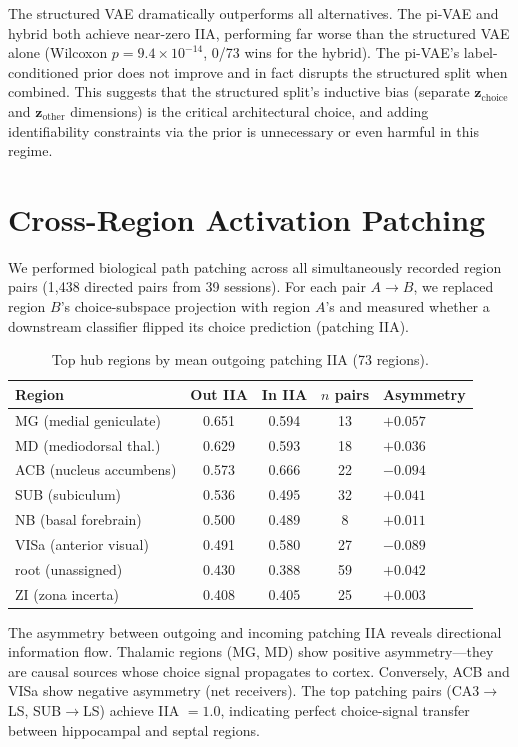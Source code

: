 \documentclass{article}
\begin{document}
The structured VAE dramatically outperforms all alternatives. The pi-VAE and hybrid both achieve near-zero IIA, performing far worse than the structured VAE alone (Wilcoxon $p = 9.4 \times 10^{-14}$, 0/73 wins for the hybrid). The pi-VAE's label-conditioned prior does not improve and in fact disrupts the structured split when combined. This suggests that the structured split's inductive bias (separate $\mathbf{z}_{\text{choice}}$ and $\mathbf{z}_{\text{other}}$ dimensions) is the critical architectural choice, and adding identifiability constraints via the prior is unnecessary or even harmful in this regime.

\section{Cross-Region Activation Patching}
\label{app:patching}

We performed biological path patching across all simultaneously recorded region pairs (1,438 directed pairs from 39 sessions). For each pair $A \to B$, we replaced region $B$'s choice-subspace projection with region $A$'s and measured whether a downstream classifier flipped its choice prediction (patching IIA).

\begin{table}[h]
\centering
\small
\caption{Top hub regions by mean outgoing patching IIA (73 regions).}
\label{tab:hubs}
\begin{tabular}{@{}lcccl@{}}
\toprule
\textbf{Region} & \textbf{Out IIA} & \textbf{In IIA} & \textbf{$n$ pairs} & \textbf{Asymmetry} \\
\midrule
MG (medial geniculate) & 0.651 & 0.594 & 13 & $+0.057$ \\
MD (mediodorsal thal.) & 0.629 & 0.593 & 18 & $+0.036$ \\
ACB (nucleus accumbens) & 0.573 & 0.666 & 22 & $-0.094$ \\
SUB (subiculum) & 0.536 & 0.495 & 32 & $+0.041$ \\
NB (basal forebrain) & 0.500 & 0.489 & 8 & $+0.011$ \\
VISa (anterior visual) & 0.491 & 0.580 & 27 & $-0.089$ \\
root (unassigned) & 0.430 & 0.388 & 59 & $+0.042$ \\
ZI (zona incerta) & 0.408 & 0.405 & 25 & $+0.003$ \\
\bottomrule
\end{tabular}
\end{table}

The asymmetry between outgoing and incoming patching IIA reveals directional information flow. Thalamic regions (MG, MD) show positive asymmetry---they are causal sources whose choice signal propagates to cortex. Conversely, ACB and VISa show negative asymmetry (net receivers). The top patching pairs (CA3$\to$LS, SUB$\to$LS) achieve IIA $= 1.0$, indicating perfect choice-signal transfer between hippocampal and septal regions.
\end{document}
